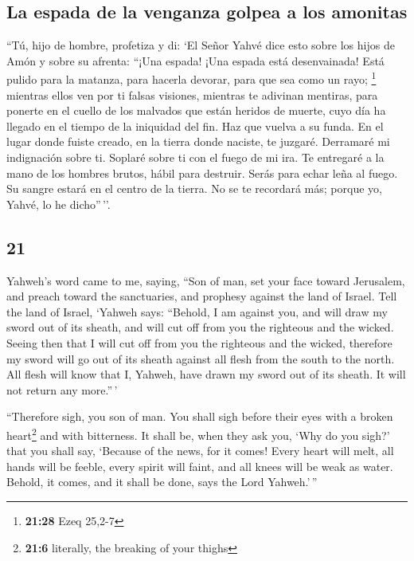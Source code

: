 \begin{paracol}{2}
\hypertarget{la-espada-de-la-venganza-golpea-a-los-amonitas}{%
\subsection{La espada de la venganza golpea a los
amonitas}\label{la-espada-de-la-venganza-golpea-a-los-amonitas}}

 ``Tú, hijo de hombre, profetiza y di: `El Señor Yahvé
dice esto sobre los hijos de Amón y sobre su afrenta: ``¡Una espada!
¡Una espada está desenvainada! Está pulido para la matanza, para hacerla
devorar, para que sea como un rayo; \footnote{\textbf{21:28} Ezeq 25,2-7}
 mientras ellos ven por ti falsas visiones, mientras te
adivinan mentiras, para ponerte en el cuello de los malvados que están
heridos de muerte, cuyo día ha llegado en el tiempo de la iniquidad del
fin.  Haz que vuelva a su funda. En el lugar donde fuiste
creado, en la tierra donde naciste, te juzgaré. 
Derramaré mi indignación sobre ti. Soplaré sobre ti con el fuego de mi
ira. Te entregaré a la mano de los hombres brutos, hábil para destruir.
 Serás para echar leña al fuego. Su sangre estará en el
centro de la tierra. No se te recordará más; porque yo, Yahvé, lo he
dicho''\,''.

\switchcolumn
\begin{otherlanguage}{english}

\hypertarget{section-41}{%
\section{21}\label{section-41}}

 Yahweh's word came to me, saying,  ``Son of
man, set your face toward Jerusalem, and preach toward the sanctuaries,
and prophesy against the land of Israel.  Tell the land of
Israel, `Yahweh says: ``Behold, I am against you, and will draw my sword
out of its sheath, and will cut off from you the righteous and the
wicked.  Seeing then that I will cut off from you the
righteous and the wicked, therefore my sword will go out of its sheath
against all flesh from the south to the north.  All flesh
will know that I, Yahweh, have drawn my sword out of its sheath. It will
not return any more.''\,'

 ``Therefore sigh, you son of man. You shall sigh before
their eyes with a broken heart\footnote{\textbf{21:6} literally, the
  breaking of your thighs} and with bitterness.  It shall
be, when they ask you, `Why do you sigh?' that you shall say, `Because
of the news, for it comes! Every heart will melt, all hands will be
feeble, every spirit will faint, and all knees will be weak as water.
Behold, it comes, and it shall be done, says the Lord Yahweh.'\,''


\end{otherlanguage}
\end{paracol}

